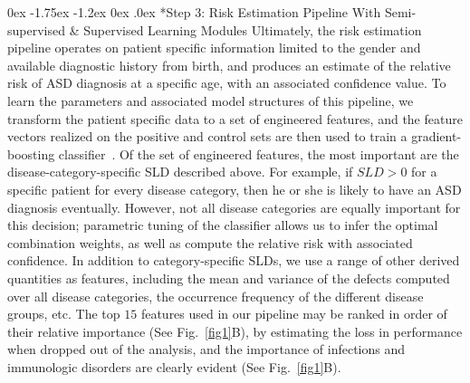 \documentclass[onecolumn, compsoc,11pt]{IEEEtran}
\makeatletter
\renewcommand\subsection{\@startsection {subsection}{2}{\z@}%
                                   {0ex \@plus -1.75ex \@minus -1.2ex}%
                                   {0ex \@plus.0ex}%
                                   {\fontsize{11}{11}\selectfont\bfseries\sffamily\color{black}}}
\def\treatment{positive\xspace}
\makeatother
\begin{document}
\subsection*{Step 3: Risk Estimation Pipeline With Semi-supervised \& Supervised Learning Modules}
Ultimately, the risk estimation pipeline operates on patient specific information limited to the
gender and available  diagnostic history from birth, and produces an estimate of the relative risk of ASD diagnosis at a specific age, with an associated  confidence value.
To learn the parameters and associated model structures of  this pipeline, we transform the patient specific data to a set of engineered features, and the feature vectors realized on the
\treatment and control sets are then used to train a gradient-boosting classifier~\cite{gbm02}. Of the set of engineered features, the most important are the  disease-category-specific SLD described above. For example, if $SLD > 0$ for a specific patient for every disease category, then he or she is likely to have an ASD diagnosis eventually. However, not all disease categories are equally important for this decision; parametric  tuning of the classifier allows us to infer the optimal combination weights, as well as compute the relative risk  with associated confidence. In addition to category-specific SLDs, we use a range of other derived quantities as features, including the mean and variance of the defects computed over all disease categories, the occurrence frequency of the different disease groups, etc. 
The top $15$ features used in our pipeline may be ranked in order of their relative importance (See Fig.~\ref{fig1}B), by estimating the loss in performance when dropped out of the analysis, and the importance of  infections and immunologic disorders are clearly evident (See Fig.~\ref{fig1}B).  

\end{document}
